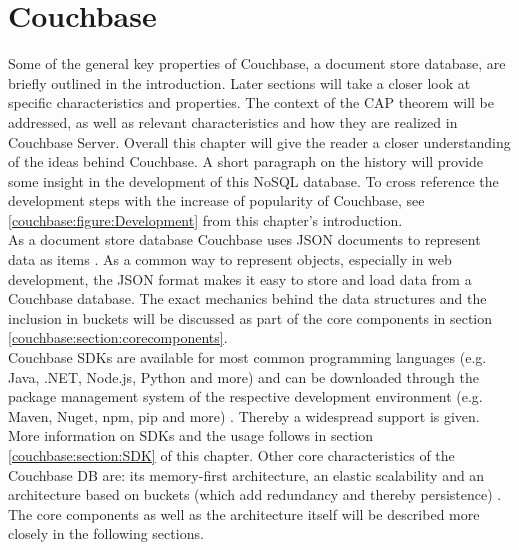 \section{Couchbase}
Some of the general key properties of Couchbase, a document store database, are briefly outlined in the introduction. Later sections will take a closer look at specific characteristics and properties. The context of the CAP theorem will be addressed, as well as relevant characteristics and how they are realized in Couchbase Server. Overall this chapter will give the reader a closer understanding of the ideas behind Couchbase. A short paragraph on the history will provide some insight in the development of this NoSQL database. To cross reference the development steps with the increase of popularity of Couchbase, see \autoref{couchbase:figure:Development} from this chapter’s introduction.\\
As a document store database Couchbase uses JSON documents to represent data as items \parencite{couchbaseAbout} \parencite{objelean}. As a common way to represent objects, especially in web development, the JSON format makes it easy to store and load data from a Couchbase database. The exact mechanics behind the data structures and the inclusion in buckets will be discussed as part of the core components in section \ref{couchbase:section:corecomponents}.\\
Couchbase SDKs are available for most common programming languages (e.g. Java, .NET, Node.js, Python and more) and can be downloaded through the package management system of the respective development environment (e.g. Maven, Nuget, npm, pip and more) \parencite{couchbaseWeb} \parencite{objelean}. Thereby a widespread support is given. More information on SDKs and the usage follows in section \ref{couchbase:section:SDK} of this chapter.
Other core characteristics of the Couchbase DB are: its memory-first architecture, an elastic scalability and an architecture based on buckets (which add redundancy and thereby persistence) \parencite{couchbaseWeb}. The core components as well as the architecture itself will be described more closely in the following sections.

